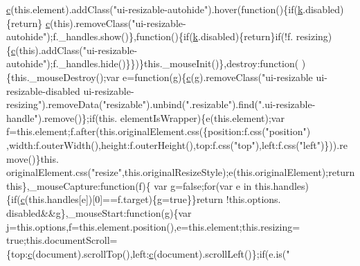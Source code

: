 \begin{DoxyCode}
      \hyperlink{jquery_8js_ad171626e81625b5e9f5cb177a3a8fb1c}{c}(this.element).addClass(\textcolor{stringliteral}{"ui-resizable-autohide"}).hover(\textcolor{keyword}{function}()\{\textcolor{keywordflow}{if}(\hyperlink{jquery_8js_ab26645c014aa005ecedef329ecf58c99}{k}.disabled)\{return\}
      \hyperlink{jquery_8js_ad171626e81625b5e9f5cb177a3a8fb1c}{c}(\textcolor{keyword}{this}).removeClass(\textcolor{stringliteral}{"ui-resizable-autohide"});f.\_handles.show()\},\textcolor{keyword}{function}()\{\textcolor{keywordflow}{if}(\hyperlink{jquery_8js_ab26645c014aa005ecedef329ecf58c99}{k}.disabled)\{\textcolor{keywordflow}{return}\}\textcolor{keywordflow}{if}(!f.
      resizing)\{\hyperlink{jquery_8js_ad171626e81625b5e9f5cb177a3a8fb1c}{c}(\textcolor{keyword}{this}).addClass(\textcolor{stringliteral}{"ui-resizable-autohide"});f.\_handles.hide()\}\})\}this.\_mouseInit()\},destroy:\textcolor{keyword}{function}(
      )\{this.\_mouseDestroy();var e=\textcolor{keyword}{function}(g)\{\hyperlink{jquery_8js_ad171626e81625b5e9f5cb177a3a8fb1c}{c}(g).removeClass(\textcolor{stringliteral}{"ui-resizable ui-resizable-disabled
       ui-resizable-resizing"}).removeData(\textcolor{stringliteral}{"resizable"}).unbind(\textcolor{stringliteral}{".resizable"}).find(\textcolor{stringliteral}{".ui-resizable-handle"}).remove()\};\textcolor{keywordflow}{if}(this.
      elementIsWrapper)\{e(this.element);var f=this.element;f.after(this.originalElement.css(\{position:f.css(\textcolor{stringliteral}{"position"})
      ,width:f.outerWidth(),height:f.outerHeight(),top:f.css(\textcolor{stringliteral}{"top"}),left:f.css(\textcolor{stringliteral}{"left"})\})).\textcolor{keyword}{remove}()\}this.
      originalElement.css(\textcolor{stringliteral}{"resize"},this.originalResizeStyle);e(this.originalElement);\textcolor{keywordflow}{return} \textcolor{keyword}{this}\},\_mouseCapture:\textcolor{keyword}{function}(f)\{
      var g=\textcolor{keyword}{false};\textcolor{keywordflow}{for}(var e in this.handles)\{\textcolor{keywordflow}{if}(\hyperlink{jquery_8js_ad171626e81625b5e9f5cb177a3a8fb1c}{c}(this.handles[e])[0]==f.target)\{g=\textcolor{keyword}{true}\}\}\textcolor{keywordflow}{return} !this.options.
      disabled&&g\},\_mouseStart:\textcolor{keyword}{function}(g)\{var j=this.options,f=this.element.position(),e=this.element;this.resizing=\textcolor{keyword}{
      true};this.documentScroll=\{top:\hyperlink{jquery_8js_ad171626e81625b5e9f5cb177a3a8fb1c}{c}(document).scrollTop(),left:\hyperlink{jquery_8js_ad171626e81625b5e9f5cb177a3a8fb1c}{c}(document).scrollLeft()\};\textcolor{keywordflow}{if}(e.is(\textcolor{stringliteral}{"
}
\end{DoxyCode}
